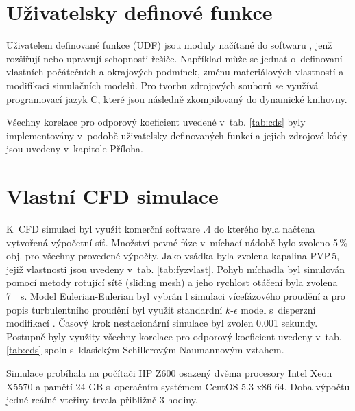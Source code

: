 \vspace{-12mm}

\section{Uživatelsky definové funkce}
Uživatelem definované funkce (UDF) jsou moduly načítané do softwaru \flu, jenž rozšiřují nebo upravují schopnosti řešiče. Například může se jednat o~definovaní vlastních počátečních a okrajových podmínek, změnu materiálových vlastností a modifikaci simulačních modelů. Pro tvorbu zdrojových souborů se využívá programovací jazyk C, které jsou následně zkompilovaný do dynamické knihovny.

Všechny korelace pro odporový koeficient uvedené v~tab. \ref{tab:cds} byly implementovány v~podobě uživatelsky definovaných funkcí a jejich zdrojové kódy jsou uvedeny v~kapitole Příloha.

\section{Vlastní CFD simulace}
K~CFD simulaci byl využit komerční software .4 do kterého byla načtena vytvořená výpočetní síť. Množství pevné fáze v~míchací nádobě bylo zvoleno 5\,\%\,obj. pro všechny provedené výpočty. Jako vsádka byla zvolena kapalina PVP\,5, jejiž vlastnosti jsou uvedeny v~tab. \ref{tab:fyzvlast}. Pohyb míchadla byl simulován pomocí metody rotující sítě (sliding mesh) a jeho rychlost otáčení byla zvolena \SI{7}{\per\second}. Model Eulerian-Eulerian byl vybrán l simulaci vícefázového proudění a pro popis turbulentního proudění byl využit standardní $k\mbox{-}\epsilon$ model s~disperzní modifikací . Časový krok nestacionární simulace byl zvolen \num{0.001} sekundy. Postupně byly využity všechny korelace pro odporový koeficient uvedeny v~tab. \ref{tab:cds} spolu s~klasickým Schillerovým-Naumannovým vztahem. 

Simulace probíhala na počítači HP Z600 osazený dvěma procesory Intel Xeon X5570 a pamětí 24 GB s~operačním systémem CentOS 5.3 x86-64. Doba výpočtu jedné reálné vteřiny trvala přibližně 3 hodiny.


